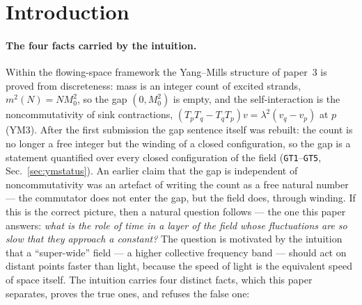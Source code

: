 \documentclass[aps,prd,preprint,superscriptaddress,amsmath,amssymb]{revtex4-2}
\begin{document}
\section{Introduction}
\label{sec:intro}

\paragraph{The four facts carried by the intuition.}
Within the flowing-space framework the Yang--Mills structure \cite{yang1954conservation,jaffe2000yang} of
paper~3 \cite{ProjectionPhysics,liu2026yangmills} is proved from
discreteness: mass is an integer count of excited strands,
$m^2(N)=N M_0^2$, so the gap $(0,M_0^2)$ is empty, and the
self-interaction is the noncommutativity of sink contractions,
$(T_pT_q-T_qT_p)v=\lambda^2(v_q-v_p)$ at $p$ (YM3).  After the first
submission the gap sentence itself was rebuilt: the count is no longer a
free integer but the winding of a closed configuration, so the gap is a
statement quantified over every closed configuration of the field
(\texttt{GT1}--\texttt{GT5}, Sec.~\ref{sec:ymstatus}).  An earlier
claim that the gap is independent of noncommutativity was an artefact of
writing the count as a free natural number --- the commutator does not
enter the gap, but the field does, through winding.  If this is the
correct picture, then a natural question follows --- the one this
paper answers: \emph{what is the role of time in a layer of the field
whose fluctuations are so slow that they approach a constant?}  The
question is motivated by the intuition that a ``super-wide'' field ---
a higher collective frequency band --- should act on distant points
faster than light, because the speed of light is the equivalent speed
of space itself.  The intuition carries four distinct facts, which
this paper separates, proves the true ones, and refuses the false
one:
\end{document}
